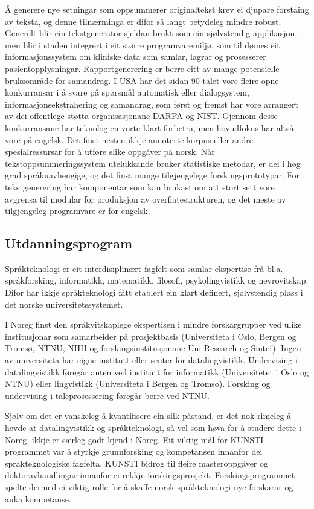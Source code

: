 \begin{multicols}{2}
Å generere nye setningar som oppsummerer originaltekst krev ei djupare forståing av teksta, og denne tilnærminga er difor så langt betydeleg mindre robust. Generelt blir ein tekstgenerator sjeldan brukt som ein sjølvstendig applikasjon, men blir i staden integrert i eit større programvaremiljø, som til dømes eit informasjonssystem om kliniske data som samlar, lagrar og prosesserer pasientopplysningar. Rapportgenerering er berre eitt av mange potensielle bruksområde for samandrag.
I USA har det sidan 90-talet vore fleire opne konkurransar i å svare på spørsmål automatisk eller dialogsystem, informasjonsekstrahering og samandrag, som først og fremst har vore arrangert av dei offentlege støtta organisasjonane DARPA og NIST. Gjennom desse konkurransane har teknologien vorte klart forbetra, men hovudfokus har altså vore på engelsk. 
Det finst nesten ikkje annoterte korpus eller andre spesialressursar for å utføre slike oppgåver på norsk. 
Når tekstoppsummeringssystem utelukkande bruker statistiske metodar, er dei i høg grad språkuavhengige, og det finst mange tilgjengelege forskingsprototypar. 
For tekstgenerering har komponentar som kan brukast om att stort sett vore avgrensa til modular for produksjon av overflatestrukturen, og det meste av tilgjengeleg programvare er for engelsk. 

\subsection{Utdanningsprogram}

Språkteknologi er eit interdisiplinært fagfelt som samlar ekspertise frå bl.a. språkforsking, informatikk, matematikk, filosofi, psykolingvistikk og nevrovitskap.
Difor har ikkje språkteknologi fått etablert ein klart definert, sjølvstendig plass i det norske universitetssystemet. 

I Noreg finst den språkvitskaplege ekspertisen i mindre forskargrupper ved ulike institusjonar som samarbeider på prosjektbasis (Universiteta i Oslo, Bergen og Tromsø, NTNU, NHH og forskingsinstitusjonane Uni Research og Sintef). Ingen av universiteta har eigne institutt eller senter for datalingvistikk. Undervising i datalingvistikk føregår anten ved institutt for informatikk (Universitetet i Oslo og NTNU) eller lingvistikk (Universiteta i Bergen og Tromsø). Forsking og undervising i taleprosessering føregår berre ved NTNU.

Sjølv om det er vanskeleg å kvantifisere ein slik påstand, er det nok rimeleg å hevde at datalingvistikk og språkteknologi, så vel som høva for å studere dette i Noreg, ikkje er særleg godt kjend i Noreg. Eit viktig mål for KUNSTI-programmet var å styrkje grunnforsking og kompetansen innanfor dei språkteknologiske fagfelta. KUNSTI bidrog til fleire masteroppgåver og doktoravhandlingar innanfor ei rekkje forskingsprosjekt. Forskingsprogrammet spelte dermed ei viktig rolle for å skaffe norsk språkteknologi nye forskarar og auka kompetanse.


\end{multicols}
